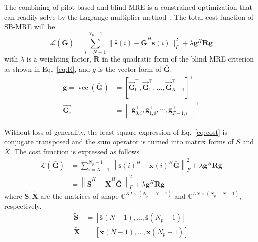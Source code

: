 The combining of pilot-based and blind MRE is a constrained optimization that can readily solve by the Lagrange multiplier method~\cite{bertsekas2014constrained}. The total cost function of SB-MRE will be
\begin{equation}
\label{eq:cost}
    \mathcal{L}(\bar{\mathbf{G}})=\sum_{i=N-1}^{N_{p} - 1}\|\bar{\mathbf{s}}(i)- \bar{\mathbf{G}}^H \mathbf{s}(i)\|_F^2 +\lambda \mathbf{g}^H \mathbf{R} \mathbf{g}
\end{equation}
with $\lambda$ is a weighting factor, $\mathbf{R}$ in the quadratic form of the blind MRE criterion as shown in Eq.~\ref{eq:R}, and $g$ is the vector form of $\bar{\mathbf{G}}$.
\begin{equation}
\label{eq:vecG}
    \begin{aligned}
        \mathbf{g} = \operatorname{vec}(\bar{\mathbf{G}}) &=\left[\vec{\mathbf{G}}_0^\top, \vec{\mathbf{G}}_1^\top, \ldots, \vec{\mathbf{G}}_{K-1}^\top\right]^\top \\
        \vec{\mathbf{G}_i} &= \left[\begin{array}{ll}
        \mathbf{g}_{0, i}^\top, \mathbf{g}_{1, i}^\top, \cdots, \mathbf{g}_{T-1, i}^\top
        \end{array}\right]^\top
    \end{aligned}
\end{equation}

Without loss of generality, the least-square expression of Eq.~\ref{eq:cost} is conjugate transposed and the sum operator is turned into matrix forms of $\widetilde{S}$ and $\widetilde{X}$. The cost function is expressed as follows
\begin{equation}
    \begin{aligned}
    \mathcal{L}(\bar{\mathbf{G}})&=\sum_{i=N-1}^{N_{p} - 1}\left\|{\bar{\mathbf{s}}(i)^H}- \mathbf{x}(i)^H \bar{\mathbf{G}}\right\|^2_F +\lambda \mathbf{g}^H \mathbf{R} \mathbf{g}\\
    &=\left\|\widetilde{\mathbf{S}}^H-\widetilde{\mathbf{X}}^H \bar{\mathbf{G}}\right\|^2_F +\lambda \mathbf{g}^H \mathbf{R} \mathbf{g}
    \end{aligned}
\end{equation}
where $\widetilde{\mathbf{S}}, \widetilde{\mathbf{X}}$ are the matrices of shape $\mathbb{C}^{KT \times (N_p -N +1)}$ and $ \mathbb{C}^{LN \times (N_p-N+1)}$, respectively.
\begin{equation*}
    \begin{aligned}
        \widetilde{\mathbf{S}} &= [\bar{\mathbf{s}}(N-1), \ldots, \bar{\mathbf{s}}\left(N_{p} - 1\right)] \\
        \widetilde{\mathbf{X}} &= [\mathbf{x}(N-1), \ldots, \mathbf{x}\left(N_{p} - 1\right)]
    \end{aligned}
\end{equation*}

